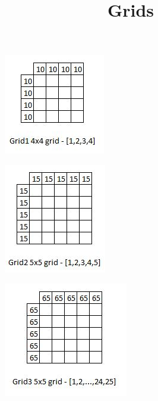 \documentclass[journal, a4paper]{IEEEtran}
\begin{document}
\title{Grids}
\maketitle

\begin{figure}[h!]
    	 \begin{center}
		\includegraphics{grid1.jpg}
    	 \end{center}
\end{figure}

\begin{figure}[h!]
    	 \begin{center}
		\includegraphics{grid2.jpg}
    	 \end{center}
\end{figure}

\begin{figure}[h!]
    	 \begin{center}
		\includegraphics{grid3.jpg}
    	 \end{center}
\end{figure}
\end{document}
